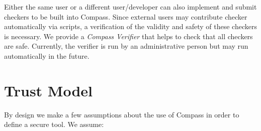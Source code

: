 Either the same user or a different user/developer can also
implement and submit checkers to be built into Compass.
Since external users may contribute checker automatically via scripts, a verification of the 
validity and safety of these checkers is necessary. We provide a \emph{Compass Verifier}
that helps to check that all checkers are safe. Currently, the verifier is run by
an administrative person but may run automatically in the future.

\section{Trust Model}
By design we make a few assumptions about the use of Compass in order to define
a secure tool. We assume:
